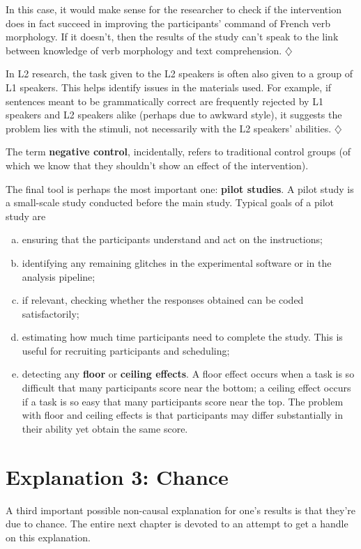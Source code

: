 \documentclass[a4paper]{tufte-book}\usepackage[]{graphicx}\usepackage[]{xcolor}
\newcommand{\term}[1]{\textbf{#1}}
\newcommand*{\parend}[1][$\diamondsuit$]{%
  \unskip\nobreak\hspace{1em plus 1fill}$\diamondsuit$%
}
\begin{document}
In this case, it would make sense for the researcher to check 
if the intervention does in fact succeed in improving the participants' 
command of French verb morphology.
If it doesn't, then the results of the study can't speak to the link
between knowledge of verb morphology and text comprehension.
\parend

In L2 research, the task given to the L2 speakers
is often also given to a group of L1 speakers.
This helps identify issues in the materials used.
For example, 
if sentences meant to be grammatically correct are frequently rejected by L1 
speakers and L2 speakers alike (perhaps due to awkward style), 
it suggests the problem lies with the stimuli, not necessarily with the L2 speakers' abilities.
\parend

The term \term{negative control}, incidentally,
refers to traditional control groups 
(of which we know that they shouldn't show an effect of the intervention).

The final tool is perhaps the most important one: \term{pilot studies}.
A pilot study is a small-scale study conducted before the main study.
 Typical goals of a pilot study are
 \begin{enumerate}[(a)]
 \item ensuring that the participants understand and act on the instructions;
 \item identifying any remaining glitches in the experimental software or in the analysis pipeline;
 \item if relevant, checking whether the responses obtained can be coded satisfactorily;
 \item estimating how much time participants need to complete the study.
 This is useful for recruiting participants and scheduling;
 \item detecting any \term{floor} or \term{ceiling effects}.
  A floor effect occurs when a task is so difficult that 
  many participants score near the bottom;
  a ceiling effect occurs if a task is so easy
  that many participants score near the top.
  The problem with floor and ceiling effects is that participants may differ
  substantially in their ability yet obtain the same score.
\end{enumerate}

\section{Explanation 3: Chance}
A third important possible non-causal explanation for one's results is 
that they're due to chance. 
The entire next chapter is devoted to an attempt to get a 
handle on this explanation.
\end{document}
